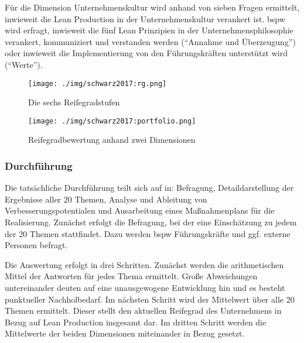 Für die Dimension Unternehmenskultur wird anhand von sieben Fragen ermittelt, inwieweit die Lean Production in der Unternehmenskultur verankert ist. 
%
\Gls{bspw} wird erfragt, inwieweit die fünf Lean Prinzipien in der Unternehmensphilosophie verankert, kommuniziert und verstanden werden (``Annahme und Überzeugung'') oder inwieweit die Implementierung von den Führungskräften unterstützt wird (``Werte''). 

\begin{figure}[!ht] 
    \begin{minipage}{0.3\linewidth} 
    \begin{center}
      \texttt{[image: ./img/schwarz2017:rg.png]}
    \end{center}
      \caption[Die sechs Reifegradstufen]{Die sechs Reifegradstufen \autocite{Schwarz2017}}\label{fig:reifegrade} 
    \end{minipage} 
    \hfill 
    \begin{minipage}{0.6\linewidth} 
 \texttt{[image: ./img/schwarz2017:portfolio.png]}
    \caption[Reifegradbewertung anhand zwei Dimensionen]{Reifegradbewertung anhand zwei Dimensionen \autocite{Schwarz2017}}\label{fig:portfoliodarstellung} 
    \end{minipage} 
  \end{figure} 

\subsubsection{Durchführung}
Die tatsächliche Durchführung teilt sich auf in: Befragung, Detaildarstellung der Ergebnisse aller 20 Themen, Analyse und Ableitung von Verbesserungspotentialen und Ausarbeitung eines Maßnahmenplans für die Realisierung. 
%
Zunächst erfolgt die Befragung, bei der eine Einschätzung zu jedem der 20 Themen stattfindet. Dazu werden \gls{bspw} Führungskräfte und ggf. externe Personen befragt. 

Die Auswertung erfolgt in drei Schritten. Zunächst werden die arithmetischen Mittel der Antworten für jedes Thema ermittelt. Große Abweichungen untereinander deuten auf eine unausgewogene Entwicklung hin und es besteht punktueller Nachholbedarf. Im nächsten Schritt wird der Mittelwert über alle 20 Themen ermittelt. Dieser stellt den aktuellen Reifegrad des Unternehmens in Bezug auf Lean Production insgesamt dar. Im dritten Schritt werden die Mittelwerte der beiden Dimensionen miteinander in Bezug gesetzt. 

